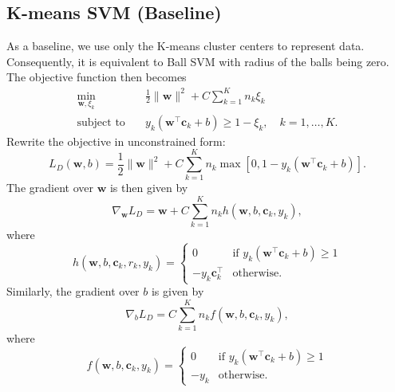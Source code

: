 \documentclass[12pt]{article}
\newcommand{\bc}{\mathbf{c}}
\newcommand{\bw}{\mathbf{w}}
\newcommand{\tx}{\tilde{x}}
\begin{document}
\subsection{K-means SVM (Baseline)}
As a baseline, we use only the K-means cluster centers to represent data. Consequently, it is equivalent to Ball SVM with radius of the balls being zero. The objective function then becomes
\begin{align}
\min_{\bw, \xi_k} &\quad\frac{1}{2} \| \bw \|^2 + C \sum_{k=1}^K n_k \xi_k \nonumber\\
\text{subject to} &\quad y_k(\bw^{\top}\bc_k + b) \ge 1 - \xi_k, \quad k = 1, \ldots, K.
\label{eq:ksvm}
\end{align}
Rewrite the objective in unconstrained form:
\begin{equation}
L_D(\bw, b) = \frac{1}{2}\|\bw\|^2 + C\sum_{k=1}^Kn_k\max[0, 1 - y_k(\bw^{\top}\bc_k +b)].
\end{equation}
The gradient over $\bw$ is then given by
$$
\nabla_{\bw} L_D = \bw + C\sum_{k=1}^K n_k h(\bw, b, \bc_k, y_k),
$$
where
$$
h(\bw, b, \bc_k, r_k, y_k) = 
  \begin{cases}
   0 & \text{if } y_k(\bw^{\top}\bc_k +b)\ge 1  \\
   -y_k\bc_k^{\top} & \text{otherwise}.
  \end{cases}
$$
Similarly, the gradient over $b$ is given by
$$
\nabla_{b} L_D = C\sum_{k=1}^K n_k f(\bw, b, \bc_k, y_k),
$$
where
$$
f(\bw, b, \bc_k, y_k) = 
  \begin{cases}
   0 & \text{if } y_k(\bw^{\top}\bc_k +b) \ge 1  \\
   -y_k & \text{otherwise}.
  \end{cases}
$$



\end{document}
